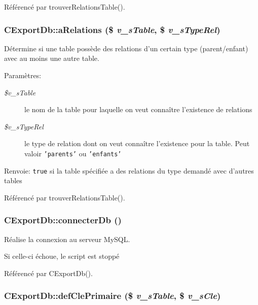 Référencé par trouverRelationsTable().
\subsubsection{\setlength{\rightskip}{0pt plus 5cm}CExportDb::aRelations (\$ {\em v\_\-sTable}, \/  \$ {\em v\_\-sTypeRel})}\label{class_c_export_db_b0e7e2feacf6080b0b290971d4d064e3}


Détermine si une table possède des relations d'un certain type (parent/enfant) avec au moins une autre table. 

\begin{Desc}
\item[Paramètres:]
\begin{description}
\item[{\em \$v\_\-sTable}]le nom de la table pour laquelle on veut connaître l'existence de relations \item[{\em \$v\_\-sTypeRel}]le type de relation dont on veut connaître l'existence pour la table. Peut valoir {\tt 'parents'} ou {\tt 'enfants'} \end{description}
\end{Desc}
\begin{Desc}
\item[Renvoie:]{\tt true} si la table spécifiée a des relations du type demandé avec d'autres tables \end{Desc}


Référencé par trouverRelationsTable().
\subsubsection{\setlength{\rightskip}{0pt plus 5cm}CExportDb::connecterDb ()}\label{class_c_export_db_cecf8f2f4d2dd15df665adade619e6ca}


Réalise la connexion au serveur MySQL. 

Si celle-ci échoue, le script est stoppé 

Référencé par CExportDb().
\subsubsection{\setlength{\rightskip}{0pt plus 5cm}CExportDb::defClePrimaire (\$ {\em v\_\-sTable}, \/  \$ {\em v\_\-sCle})}\label{class_c_export_db_3366667eaf74b210ee84f0ed2a9926f6}


